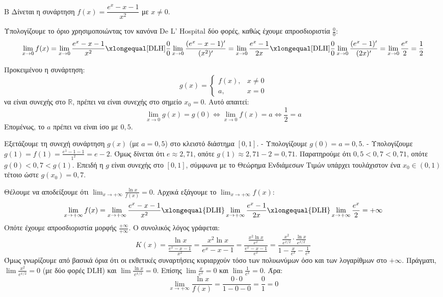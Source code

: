 \begin{thema}{Β}
Δίνεται η συνάρτηση $f(x) = \dfrac{e^x - x - 1}{x^2}$ με $x \ne 0$.
\begin{erwthma}
\item Υπολογίζουμε το όριο χρησιμοποιώντας τον κανόνα De L' Hospital δύο φορές, καθώς έχουμε απροσδιοριστία $\frac{0}{0}$:
\[ \lim_{x\to0} f(x) = \lim_{x\to0} \frac{e^x - x - 1}{x^2} \xlongequal[\text{DLH}]{\frac{0}{0}} \lim_{x\to0} \frac{(e^x - x - 1)'}{(x^2)'} = \lim_{x\to0} \frac{e^x - 1}{2x} \xlongequal[\text{DLH}]{\frac{0}{0}} \lim_{x\to0} \frac{(e^x - 1)'}{(2x)'} = \lim_{x\to0} \frac{e^x}{2} = \frac{1}{2} \]

\item Προκειμένου η συνάρτηση:
\[ g(x) = \begin{cases} f(x), & x \ne 0 \\ a, & x = 0 \end{cases} \]
να είναι συνεχής στο $\mathbb{R}$, πρέπει να είναι συνεχής στο σημείο $x_0 = 0$. Αυτό απαιτεί:
\[ \lim_{x\to0} g(x) = g(0) \Leftrightarrow \lim_{x\to0} f(x) = a \Leftrightarrow \frac{1}{2} = a \]
Επομένως, το $a$ πρέπει να είναι ίσο με $0,5$.

\item Εξετάζουμε τη συνεχή συνάρτηση $g(x)$ (με $a=0,5$) στο κλειστό διάστημα $[0, 1]$.
- Υπολογίζουμε $g(0) = a = 0,5$.
- Υπολογίζουμε $g(1) = f(1) = \frac{e^1 - 1 - 1}{1^2} = e - 2$. 
Όμως δίνεται ότι $e \approx 2,71$, οπότε $g(1) \approx 2,71 - 2 = 0,71$.
Παρατηρούμε ότι $0,5 < 0,7 < 0,71$, οπότε $g(0) < 0,7 < g(1)$.
Επειδή η $g$ είναι συνεχής στο $[0, 1]$, σύμφωνα με το Θεώρημα Ενδιάμεσων Τιμών υπάρχει τουλάχιστον ένα $x_0 \in (0, 1)$ τέτοιο ώστε $g(x_0) = 0,7$.

\item Θέλουμε να αποδείξουμε ότι $\lim_{x\to+\infty} \frac{\ln x}{f(x)} = 0$.
Αρχικά εξάγουμε το $\lim_{x\to+\infty} f(x)$:
\[ \lim_{x\to+\infty} f(x) = \lim_{x\to+\infty} \frac{e^x - x - 1}{x^2} \xlongequal{\text{DLH}} \lim_{x\to+\infty} \frac{e^x - 1}{2x} \xlongequal{\text{DLH}} \lim_{x\to+\infty} \frac{e^x}{2} = +\infty \]
Οπότε έχουμε απροσδιοριστία μορφής $\frac{+\infty}{+\infty}$. 
Ο συνολικός λόγος γράφεται:
\[ K(x) = \frac{\ln x}{\frac{e^x-x-1}{x^2}} = \frac{x^2 \ln x}{e^x - x - 1} = \frac{\frac{x^2 \ln x}{e^x}}{\frac{e^x - x - 1}{e^x}} = \frac{\frac{x^2}{e^{x/2}} \cdot \frac{\ln x}{e^{x/2}}}{1 - \frac{x}{e^x} - \frac{1}{e^x}} \]
Όμως γνωρίζουμε από βασικά όρια ότι οι εκθετικές συναρτήσεις κυριαρχούν τόσο των πολυωνύμων όσο και των λογαρίθμων στο $+\infty$. 
Πράγματι, $\lim \frac{x^2}{e^{x/2}} = 0$ (με δύο φορές DLH) και $\lim \frac{\ln x}{e^{x/2}} = 0$. 
Επίσης $\lim \frac{x}{e^x} = 0$ και $\lim \frac{1}{e^x} = 0$. 
Άρα:
\[ \lim_{x\to+\infty} \frac{\ln x}{f(x)} = \frac{0 \cdot 0}{1 - 0 - 0} = \frac{0}{1} = 0 \]
\end{erwthma}
\end{thema}

